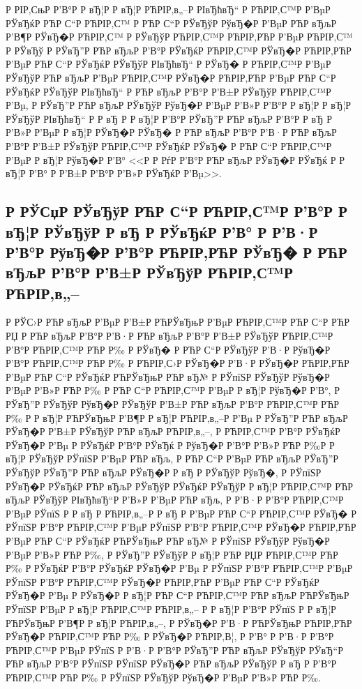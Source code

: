 \documentclass[a4paper,14pt]{extarticle}
\begin{document}
Р  РІР‚СњР  Р’В°Р  Р вЂ¦Р  Р вЂ¦Р РЋРІР‚в„–Р  РІвЂћвЂ“ Р РЋРІР‚С™Р  Р’ВµР  РЎвЂќР РЋР С“Р РЋРІР‚С™ Р РЋР С“Р  РЎвЂўР  РўвЂ�Р  Р’ВµР РЋР вЂљР  Р’В¶Р  РЎвЂ�Р РЋРІР‚С™ Р  РЎвЂўР РЋРІР‚С™Р РЋРІР‚РЋР  Р’ВµР РЋРІР‚С™ Р  РЎвЂў Р  РЎвЂ”Р РЋР вЂљР  Р’В°Р  РЎвЂќР РЋРІР‚С™Р  РЎвЂ�Р РЋРІР‚РЋР  Р’ВµР РЋР С“Р  РЎвЂќР  РЎвЂўР  РІвЂћвЂ“ Р  РЎвЂ� Р РЋРІР‚С™Р  Р’ВµР  РЎвЂўР РЋР вЂљР  Р’ВµР РЋРІР‚С™Р  РЎвЂ�Р РЋРІР‚РЋР  Р’ВµР РЋР С“Р  РЎвЂќР  РЎвЂўР  РІвЂћвЂ“ Р РЋР вЂљР  Р’В°Р  Р’В±Р  РЎвЂўР РЋРІР‚С™Р  Р’Вµ, Р  РЎвЂ”Р РЋР вЂљР  РЎвЂўР  РўвЂ�Р  Р’ВµР  Р’В»Р  Р’В°Р  Р вЂ¦Р  Р вЂ¦Р  РЎвЂўР  РІвЂћвЂ“ Р  Р вЂ  Р  Р вЂ¦Р  Р’В°Р  РЎвЂ”Р РЋР вЂљР  Р’В°Р  Р вЂ Р  Р’В»Р  Р’ВµР  Р вЂ¦Р  РЎвЂ�Р  РЎвЂ� Р РЋР вЂљР  Р’В°Р  Р’В·Р РЋР вЂљР  Р’В°Р  Р’В±Р  РЎвЂўР РЋРІР‚С™Р  РЎвЂќР  РЎвЂ� Р РЋР С“Р РЋРІР‚С™Р  Р’ВµР  Р вЂ¦Р  РўвЂ�Р  Р’В° <<Р  Р РѓР  Р’В°Р РЋР вЂљР  РЎвЂ�Р  РЎвЂќ Р  Р вЂ¦Р  Р’В° Р  Р’В±Р  Р’В°Р  Р’В»Р  РЎвЂќР  Р’Вµ>>. 

\clearpage

\subsection{Р  РЎСџР  РЎвЂўР РЋР С“Р РЋРІР‚С™Р  Р’В°Р  Р вЂ¦Р  РЎвЂўР  Р вЂ Р  РЎвЂќР  Р’В° Р  Р’В·Р  Р’В°Р  РўвЂ�Р  Р’В°Р РЋРІР‚РЋР  РЎвЂ� Р РЋР вЂљР  Р’В°Р  Р’В±Р  РЎвЂўР РЋРІР‚С™Р РЋРІР‚в„–}
Р  РЎС›Р РЋР вЂљР  Р’ВµР  Р’В±Р РЋРЎвЂњР  Р’ВµР РЋРІР‚С™Р РЋР С“Р РЋР РЏ Р РЋР вЂљР  Р’В°Р  Р’В·Р РЋР вЂљР  Р’В°Р  Р’В±Р  РЎвЂўР РЋРІР‚С™Р  Р’В°Р РЋРІР‚С™Р РЋР Р‰ Р  РЎвЂ� Р РЋР С“Р  РЎвЂўР  Р’В·Р  РўвЂ�Р  Р’В°Р РЋРІР‚С™Р РЋР Р‰ Р РЋРІР‚С›Р  РЎвЂ�Р  Р’В·Р  РЎвЂ�Р РЋРІР‚РЋР  Р’ВµР РЋР С“Р  РЎвЂќР РЋРЎвЂњР РЋР вЂ№ Р  РЎпїЅР  РЎвЂўР  РўвЂ�Р  Р’ВµР  Р’В»Р РЋР Р‰ Р РЋР С“Р РЋРІР‚С™Р  Р’ВµР  Р вЂ¦Р  РўвЂ�Р  Р’В°, Р  РЎвЂ”Р  РЎвЂўР  РўвЂ�Р  РЎвЂўР  Р’В±Р РЋР вЂљР  Р’В°Р РЋРІР‚С™Р РЋР Р‰ Р  Р вЂ¦Р РЋРЎвЂњР  Р’В¶Р  Р вЂ¦Р РЋРІР‚в„–Р  Р’Вµ Р  РЎвЂ”Р РЋР вЂљР  РЎвЂ�Р  Р’В±Р  РЎвЂўР РЋР вЂљР РЋРІР‚в„–, Р РЋРІР‚С™Р  Р’В°Р  РЎвЂќР  РЎвЂ�Р  Р’Вµ Р  РЎвЂќР  Р’В°Р  РЎвЂќ Р  РўвЂ�Р  Р’В°Р  Р’В»Р РЋР Р‰Р  Р вЂ¦Р  РЎвЂўР  РЎпїЅР  Р’ВµР РЋР вЂљ, Р РЋР С“Р  Р’ВµР РЋР вЂљР  РЎвЂ”Р  РЎвЂўР  РЎвЂ”Р РЋР вЂљР  РЎвЂ�Р  Р вЂ Р  РЎвЂўР  РўвЂ�, Р  РЎпїЅР  РЎвЂ�Р  РЎвЂќР РЋР вЂљР  РЎвЂўР  РЎвЂќР  РЎвЂўР  Р вЂ¦Р РЋРІР‚С™Р РЋР вЂљР  РЎвЂўР  РІвЂћвЂ“Р  Р’В»Р  Р’ВµР РЋР вЂљ, Р  Р’В·Р  Р’В°Р РЋРІР‚С™Р  Р’ВµР  РЎпїЅ Р  Р вЂ Р РЋРІР‚в„–Р  Р вЂ Р  Р’ВµР РЋР С“Р РЋРІР‚С™Р  РЎвЂ� Р  РЎпїЅР  Р’В°Р РЋРІР‚С™Р  Р’ВµР  РЎпїЅР  Р’В°Р РЋРІР‚С™Р  РЎвЂ�Р РЋРІР‚РЋР  Р’ВµР РЋР С“Р  РЎвЂќР РЋРЎвЂњР РЋР вЂ№ Р  РЎпїЅР  РЎвЂўР  РўвЂ�Р  Р’ВµР  Р’В»Р РЋР Р‰, Р  РЎвЂ”Р  РЎвЂўР  Р вЂ¦Р РЋР РЏР РЋРІР‚С™Р РЋР Р‰ Р  РЎвЂќР  Р’В°Р  РЎвЂќР  РЎвЂ�Р  Р’Вµ Р  РЎпїЅР  Р’В°Р РЋРІР‚С™Р  Р’ВµР  РЎпїЅР  Р’В°Р РЋРІР‚С™Р  РЎвЂ�Р РЋРІР‚РЋР  Р’ВµР РЋР С“Р  РЎвЂќР  РЎвЂ�Р  Р’Вµ Р  РЎвЂ�Р  Р вЂ¦Р РЋР С“Р РЋРІР‚С™Р РЋР вЂљР РЋРЎвЂњР  РЎпїЅР  Р’ВµР  Р вЂ¦Р РЋРІР‚С™Р РЋРІР‚в„– Р  Р вЂ¦Р  Р’В°Р  РЎпїЅ Р  Р вЂ¦Р РЋРЎвЂњР  Р’В¶Р  Р вЂ¦Р РЋРІР‚в„–, Р  РЎвЂ�Р  Р’В·Р РЋРЎвЂњР РЋРІР‚РЋР  РЎвЂ�Р РЋРІР‚С™Р РЋР Р‰ Р  РЎвЂ�Р РЋРІР‚В¦, Р  Р’В° Р  Р’В·Р  Р’В°Р РЋРІР‚С™Р  Р’ВµР  РЎпїЅ Р  Р’В·Р  Р’В°Р  РЎвЂ”Р РЋР вЂљР  РЎвЂўР  РЎвЂ“Р РЋР вЂљР  Р’В°Р  РЎпїЅР  РЎпїЅР  РЎвЂ�Р РЋР вЂљР  РЎвЂўР  Р вЂ Р  Р’В°Р РЋРІР‚С™Р РЋР Р‰ Р  РЎпїЅР  РЎвЂўР  РўвЂ�Р  Р’ВµР  Р’В»Р РЋР Р‰.
\end{document}
